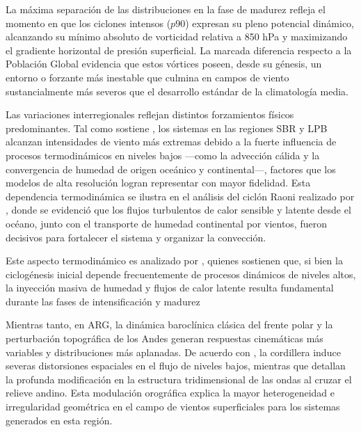 La máxima separación de las distribuciones en la fase de madurez refleja el momento en que los ciclones intensos ($p90$) expresan su pleno potencial dinámico, alcanzando su mínimo absoluto de vorticidad relativa a 850 hPa y maximizando el gradiente horizontal de presión superficial. La marcada diferencia respecto a la Población Global evidencia que estos vórtices poseen, desde su génesis, un entorno o forzante más inestable que culmina en campos de viento sustancialmente más severos que el desarrollo estándar de la climatología media.

Las variaciones interregionales reflejan distintos forzamientos físicos predominantes. Tal como sostiene \citet{gramcianinov2024early}, los sistemas en las regiones SBR y LPB alcanzan intensidades de viento más extremas debido a la fuerte influencia de procesos termodinámicos en niveles bajos —como la advección cálida y la convergencia de humedad de origen oceánico y continental—, factores que los modelos de alta resolución logran representar con mayor fidelidad. 
Esta dependencia termodinámica se ilustra en el análisis del ciclón Raoni realizado por \citet{reboita2022from}, donde se evidenció que los flujos turbulentos de calor sensible y latente desde el océano, junto con el transporte de humedad continental por vientos, fueron decisivos para fortalecer el sistema y organizar la convección. 

Este aspecto termodinámico es analizado por \citet{russo2025impacts}, quienes sostienen que, si bien la ciclogénesis inicial depende frecuentemente de procesos dinámicos de niveles altos, la inyección masiva de humedad y flujos de calor latente resulta fundamental durante las fases de intensificación y madurez

Mientras tanto, en ARG, la dinámica baroclínica clásica del frente polar y la perturbación topográfica de los Andes generan respuestas cinemáticas más variables y distribuciones más aplanadas. 
De acuerdo con \citet{gan1994influence}, la cordillera induce severas distorsiones espaciales en el flujo de niveles bajos, mientras que \citet{vera2002cold} detallan la profunda modificación en la estructura tridimensional de las ondas al cruzar el relieve andino. 
Esta modulación orográfica explica la mayor heterogeneidad e irregularidad geométrica en el campo de vientos superficiales para los sistemas generados en esta región.

